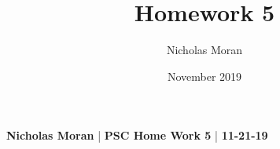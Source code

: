 \documentclass[letterpaper,12pt]{article}
\title{Homework 5}
\author{Nicholas Moran}
\date{November 2019}
\begin{document}
    \textbf{Nicholas Moran} | \textbf{PSC Home Work 5} | \textbf{11-21-19}
    
    
\end{document}
